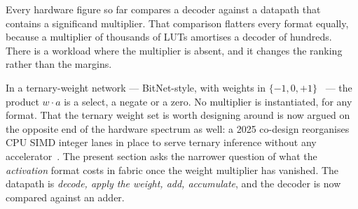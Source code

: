 Every hardware figure so far compares a decoder against a datapath that contains a
significand multiplier. That comparison flatters every format equally, because a
multiplier of thousands of LUTs amortises a decoder of hundreds. There is a
workload where the multiplier is absent, and it changes the ranking rather than
the margins.

In a ternary-weight network --- BitNet-style, with weights in
$\{-1, 0, +1\}$~\cite{bitnet} --- the product $w \cdot a$ is a select, a negate or
a zero. No multiplier is instantiated, for any format. That the ternary weight set
is worth designing around is now argued on the opposite end of the hardware
spectrum as well: a 2025 co-design reorganises CPU SIMD integer lanes in place to
serve ternary inference without any accelerator~\cite{oh2025tsar}. The present
section asks the narrower question of what the \emph{activation} format costs in
fabric once the weight multiplier has vanished. The datapath is
\emph{decode, apply the weight, add, accumulate}, and the decoder is now compared
against an adder.

